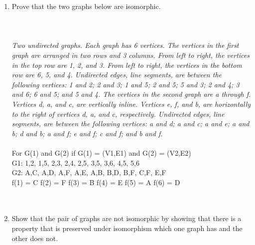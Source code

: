 \begin{enumerate}[label=(\alph*)]
\item Prove that the two graphs below are isomorphic.\\\\
   \\\\
 {\color{blue}{\bf Figure 4:} \emph{Two undirected graphs. Each graph has 6 vertices. The vertices in the first graph are arranged in two rows and 3 columns. From left to right, the vertices in the top row are 1, 2, and 3. From left to right, the vertices in the bottom row are 6, 5, and 4. Undirected edges, line segments, are between the following vertices: 1 and 2; 2 and 3; 1 and 5; 2 and 5; 5 and 3; 2 and 4; 3 and 6; 6 and 5; and 5 and 4. The vertices in the second graph are a through f. Vertices d, a, and c, are vertically inline. Vertices e, f, and b, are horizontally to the right of vertices d, a, and c, respectively. Undirected edges, line segments, are between the following vertices: a and d; a and c; a and e; a and b; d and b; a and f; e and f; c and f; and b and f.
}
}
\\\\
For G(1) and G(2) if G(1) = (V1,E1) and G(2) = (V2,E2) \\

G1: {1,2}, {1,5}, {2,3}, {2,4}, {2,5}, {3,5}, {3,6}, {4,5}, {5,6} \\

G2: {A,C}, {A,D}, {A,F}, {A,E}, {A,B}, {B,D}, {B,F}, {C,F}, {E,F} \\

f(1) = C f(2) = F f(3) = B f(4) = E f(5) = A f(6) = D
\\


\\\\
\item Show that the pair of graphs are not isomorphic by showing that there is a property that is preserved under isomorphism which one graph has and the other does not.\\


\end{enumerate}
